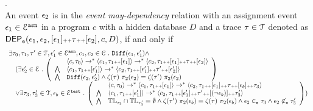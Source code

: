 %
\begin{defn}.
\label{def:event_dep}
\\ 
  An event $\mathtt{\epsilon}_2$ is in the \emph{event may-dependency} relation with an assignment
  event $\mathtt{\epsilon}_1 \in \mathcal{E}^{\mathtt{{asn}}}$ in a program ${c}$
  with a hidden database $D$ and a trace $\mathtt{\tau} \in \mathcal{T}$ denoted as 
  $\mathsf{DEP_{\mathtt{e}}}(\mathtt{\epsilon}_1, \mathtt{\epsilon}_2, [\mathtt{\epsilon}_1 ] {\scriptscriptstyle ++} \mathtt{\tau} {\scriptscriptstyle ++} [\mathtt{\epsilon}_2], c, D)$, if and only if
  \[
    \begin{array}{l}
  \exists \vtrace_0,
  \vtrace_1, \vtrace' \in \mathcal{T},\event_1' \in \eventset^{\asn}, {c}_1, {c}_2  \in \cdom  \st
  \diff(\event_1, \event_1') \land 
      \\ \quad
      (
        \exists  \event_2' \in \eventset \st 
    \left(
    \begin{array}{ll}   
   & \config{{c}, \vtrace_0} \rightarrow^{*} 
  \config{{c}_1, \vtrace_1 \tracecat [\event_1]}  \rightarrow^{*} 
    \config{{c}_2,  \vtrace_1 \tracecat [\event_1] \tracecat \vtrace \tracecat [\event_2] } 
   \\ 
   \bigwedge &
    \config{{c}_1, \vtrace_1 \tracecat [\event_1']}  \rightarrow^{*} 
    \config{{c}_2,  \vtrace_1 \tracecat[ \event_1'] \tracecat \vtrace' \tracecat [\event_2'] } 
  \\
  \bigwedge & 
  \diff(\event_2,\event_2' ) \land 
  \vcounter(\vtrace) ~ \pi_2(\event_2)
  = 
  \vcounter(\vtrace') ~ \pi_2(\event_2)\\
  \end{array}
  \right)
  \\ \quad
  \lor 
  \exists \vtrace_3, \vtrace_3'  \in \mathcal{T}, \event_b \in \eventset^{\test} \st 
  \left(
  \begin{array}{ll}   
    & \config{{c}, \vtrace_0} \rightarrow^{*} 
      \config{{c}_1, \vtrace_1 \tracecat [\event_1]}  \rightarrow^{*} 
      \config{c_2,  \vtrace_1 \tracecat [\event_1] \tracecat \trace \tracecat [\event_b] \tracecat  \trace_3} 
    \\ 
    \bigwedge &
    \config{{c}_1, \vtrace_1 \tracecat [\event_1']}  \rightarrow^{*} 
    \config{c_2,  \vtrace_1 \tracecat [\event_1'] \tracecat \trace' \tracecat [(\neg \event_b)] \tracecat \trace_3'} 
    \\
    \bigwedge &  \tlabel_{\trace_3} \cap \tlabel_{\trace_3'} = \emptyset
     \land \vcounter(\trace') ~  \pi_2(\event_b) = \vcounter(\trace) ~  \pi_2(\event_b)
      \land \event_2 \eventin \trace_3
    \land \event_2 \not\eventin \trace_3'
  \end{array}
  \right)
  )
\end{array}
   \]
%
\end{defn}
%
%
%
%
